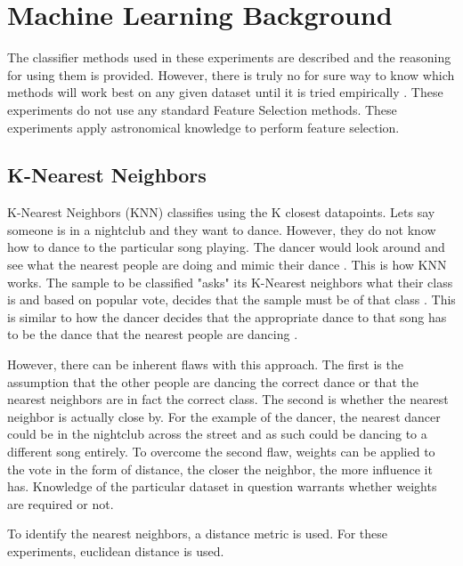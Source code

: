 \documentclass[./AutomatedMK.tex]{subfiles}
\begin{document}
\section{Machine Learning Background}\label{sec:ML}
The classifier methods used in these experiments are described and the reasoning for using them is provided. However, there is truly no for sure way to know which methods will work best on any given dataset until it is tried empirically \citep{VanderPlas}. These experiments do not use any standard Feature Selection methods. These experiments apply astronomical knowledge to perform feature selection.

\subsection{K-Nearest Neighbors}

K-Nearest Neighbors (KNN) classifies using the K closest datapoints. Lets say someone is in a nightclub and they want to dance. However, they do not know how to dance to the particular song playing. The dancer would look around and see what the nearest people are doing and mimic their dance \citep{Marsland}. This is how KNN works. The sample to be classified "asks" its K-Nearest neighbors what their class is and based on popular vote, decides that the sample must be of that class \citep{Marsland}. This is similar to how the dancer decides that the appropriate dance to that song has to be the dance that the nearest people are dancing \citep{Marsland}. 

However, there can be inherent flaws with this approach. The first is the assumption that the other people are dancing the correct dance or that the nearest neighbors are in fact the correct class. The second is whether the nearest neighbor is actually close by. For the example of the dancer, the nearest dancer could be in the nightclub across the street and as such could be dancing to a different song entirely. To overcome the second flaw, weights can be applied to the vote in the form of distance, the closer the neighbor, the more influence it has. Knowledge of the particular dataset in question warrants whether weights are required or not.

To identify the nearest neighbors, a distance metric is used. For these experiments, euclidean distance is used.
\end{document}
